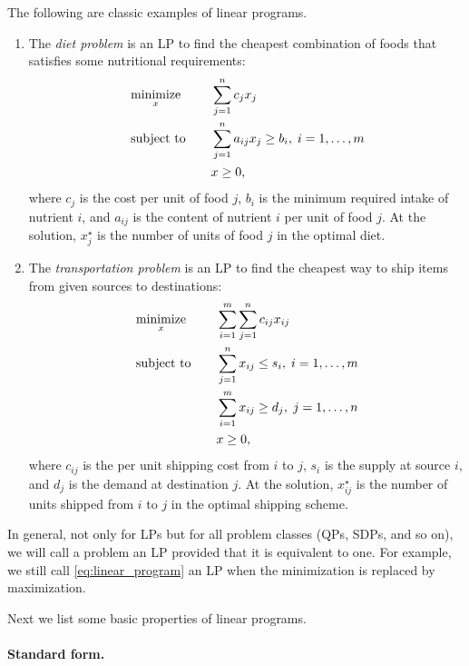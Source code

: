 \begin{Example}
The following are classic examples of linear programs. 

\begin{enumerate}[label=\alph*.]
\item The \emph{diet problem} is an LP to find the cheapest combination of 
  foods that satisfies some nutritional requirements:
  \begin{alignat*}{2}
    &\operatorname*{minimize}_x \quad && \sum_{j=1}^n c_j x_j \\
    &\operatorname{subject\,\,to} \quad && \sum_{j=1}^n a_{ij} x_j \geq b_i, \; i=1,\ldots,m \\  
    & && x \geq 0,
  \end{alignat*}
  where $c_j$ is the cost per unit of food $j$, $b_i$ is the minimum required
  intake of nutrient $i$, and $a_{ij}$ is the content of nutrient $i$ per unit
  of food $j$. At the solution, $x^\star_j$ is the number of units of food $j$ 
  in the optimal diet. 

\item The \emph{transportation problem} is an LP to find the cheapest way to
  ship items from given sources to destinations:
  \begin{alignat*}{2}
   &\operatorname*{minimize}_x \quad && \sum_{i=1}^m \sum_{j=1}^n c_{ij} x_{ij} \\ 
   &\operatorname{subject\,\,to} \quad && \sum_{j=1}^n x_{ij} \leq s_i, \; i=1,\dots,m \\
   & && \sum_{i=1}^m x_{ij} \geq d_j, \; j=1,\dots,n \\
   & && x \geq 0,
 \end{alignat*}
 where $c_{ij}$ is the per unit shipping cost from $i$ to $j$, $s_i$ is the
 supply at source $i$, and $d_j$ is the demand at destination $j$. At the
 solution, $x^\star_{ij}$ is the number of units shipped from $i$ to $j$ in the
 optimal shipping scheme. 
\end{enumerate}
\end{Example} 

In general, not only for LPs but for all problem classes (QPs, SDPs, and so on),
we will call a problem an LP provided that it is equivalent to one. For example,
we still call \eqref{eq:linear_program} an LP when the minimization is replaced
by maximization.  

Next we list some basic properties of linear programs. 

\paragraph{Standard form.}

